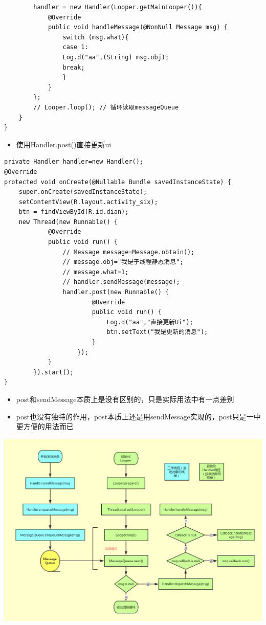 \documentclass[9pt, b5paper]{article}
\begin{document}
\begin{enumerate}
\begin{verbatim}
        handler = new Handler(Looper.getMainLooper()){
            @Override
            public void handleMessage(@NonNull Message msg) {
                switch (msg.what){
                case 1:
                Log.d("aa",(String) msg.obj);
                break;
                }
            }
        };
        // Looper.loop(); // 循环读取messageQueue
    }
}
\end{verbatim}
\begin{itemize}
\item 使用Handler.post()直接更新ui
\end{itemize}
\begin{verbatim}
private Handler handler=new Handler();
@Override
protected void onCreate(@Nullable Bundle savedInstanceState) {
    super.onCreate(savedInstanceState);
    setContentView(R.layout.activity_six);
    btn = findViewById(R.id.dian);
    new Thread(new Runnable() {
            @Override
            public void run() {
                // Message message=Message.obtain();
                // message.obj="我是子线程静态消息";
                // message.what=1;
                // handler.sendMessage(message);
                handler.post(new Runnable() {
                        @Override
                        public void run() {
                            Log.d("aa","直接更新Ui");
                            btn.setText("我是更新的消息");
                        }
                    });
            }
        }).start();
}
\end{verbatim}
\begin{itemize}
\item post和sendMessage本质上是没有区别的，只是实际用法中有一点差别
\item post也没有独特的作用，post本质上还是用sendMessage实现的，post只是一中更方便的用法而已
\end{itemize}

\includegraphics[width=.9\linewidth]{./pic/handler.png}
\end{enumerate}
\end{document}
